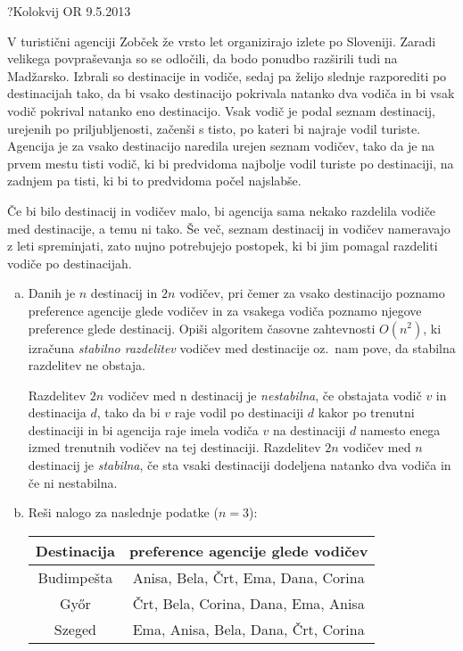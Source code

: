 \begin{naloga}{?}{Kolokvij OR 9.5.2013}
\begin{vprasanje}
V turistični agenciji Zobček že vrsto let organizirajo izlete po Sloveniji.
Zaradi velikega povpraševanja so se odločili,
da bodo ponudbo razširili tudi na Madžarsko.
Izbrali so destinacije in vodiče,
sedaj pa želijo slednje razporediti po destinacijah tako,
da bi vsako destinacijo pokrivala natanko dva vodiča
in bi vsak vodič pokrival natanko eno destinacijo.
Vsak vodič je podal seznam destinacij, urejenih po priljubljenosti,
začenši s tisto, po kateri bi najraje vodil turiste.
Agencija je za vsako destinacijo naredila urejen seznam vodičev,
tako da je na prvem mestu tisti vodič,
ki bi predvidoma najbolje vodil turiste po destinaciji,
na zadnjem pa tisti, ki bi to predvidoma počel najslabše.

Če bi bilo destinacij in vodičev malo,
bi agencija sama nekako razdelila vodiče med destinacije, a temu ni tako.
Še več, seznam destinacij in vodičev nameravajo z leti spreminjati,
zato nujno potrebujejo postopek,
ki bi jim pomagal razdeliti vodiče po destinacijah.

\begin{enumerate}[(a)]
\item Danih je $n$ destinacij in $2n$ vodičev,
pri čemer za vsako destinacijo poznamo preference agencije glede vodičev
in za vsakega vodiča poznamo njegove preference glede destinacij.
Opiši algoritem časovne zahtevnosti $O(n^2)$,
ki izračuna {\em stabilno razdelitev} vodičev med destinacije oz.~nam pove,
da stabilna razdelitev ne obstaja.

Razdelitev $2n$ vodičev med n destinacij je {\em nestabilna},
če obstajata vodič $v$ in destinacija $d$,
tako da bi $v$ raje vodil po destinaciji $d$ kakor po trenutni destinaciji
in bi agencija raje imela vodiča $v$ na destinaciji $d$
namesto enega izmed trenutnih vodičev na tej destinaciji.
Razdelitev $2n$ vodičev med $n$ destinacij je {\em stabilna},
če sta vsaki destinaciji dodeljena natanko dva vodiča in če ni nestabilna.

\item Reši nalogo za naslednje podatke ($n = 3$):
\begin{center}
\begin{tabular}{c|c}
Destinacija & preference agencije glede vodičev \\ \hline
Budimpešta  & Anisa, Bela, Črt, Ema, Dana, Corina \\
Győr        & Črt, Bela, Corina, Dana, Ema, Anisa \\
Szeged      & Ema, Anisa, Bela, Dana, Črt, Corina
\end{tabular}


\end{center}
\end{enumerate}
\end{vprasanje}
\end{naloga}
